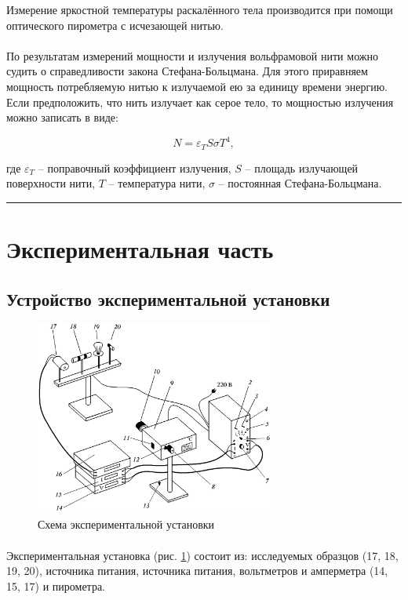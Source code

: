 \documentclass[a4paper,12pt]{article} %
\begin{document}
Измерение яркостной температуры раскалённого тела производится при помощи оптического пирометра с исчезающей нитью. 

\paragraph{} По результатам измерений мощности и излучения вольфрамовой нити можно судить о справедливости закона Стефана-Больцмана. Для этого приравняем мощность потребляемую нитью к излучаемой  ею за единицу времени энергию. Если предположить, что нить излучает как серое тело, то мощностью излучения можно записать в виде:

\[
N = \varepsilon_T S \sigma T^4,
\]

\noindent где $\varepsilon_T$ -- поправочный коэффициент излучения, $S$ -- площадь излучающей поверхности нити, $T$ -- температура нити, $\sigma$ -- постоянная Стефана-Больцмана.

\medskip\hrule\medskip

\section{Экспериментальная часть}

\subsection{Устройство экспериментальной установки}

\begin{figure}[h]
\centering
\includegraphics[width=0.7\textwidth]{setup.png}
\caption{Схема экспериментальной установки}
\label{fig:setup}
\end{figure}

\paragraph{} Экспериментальная установка (рис. \ref{fig:setup}) состоит из: исследуемых образцов (17, 18, 19, 20), источника питания, источника питания, вольтметров и амперметра (14, 15, 17) и пирометра.
\end{document}
